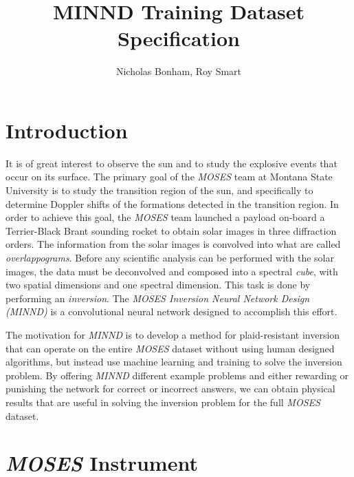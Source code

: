 \documentclass[10pt,a4paper,titlepage]{article}
\author{Nicholas Bonham, Roy Smart}
\title{MINND Training Dataset Specification}
\begin{document}
	\maketitle
	\section{Introduction}
		It is of great interest to observe the sun and to study the explosive events that occur on its  surface. The primary goal of the \textit{MOSES} team at Montana State University is to study the transition region of the sun, and specifically to determine Doppler shifts of the formations detected in the transition region. In order to achieve this goal, the \textit{MOSES} team launched a payload on-board a Terrier-Black Brant sounding rocket to obtain solar images in three diffraction orders. The information from the solar images is convolved into what are called \textit{overlappograms}. Before any scientific analysis can be performed with the solar images, the data must be deconvolved and composed into a spectral \textit{cube}, with two spatial dimensions and one spectral dimension. This task is done by performing an \textit{inversion}. The \textit{MOSES Inversion Neural Network Design (MINND)} is a convolutional neural network designed to accomplish this effort.
		
		The motivation for \textit{MINND} is to develop a method for plaid-resistant inversion that can operate on the entire \textit{MOSES} dataset without using human designed algorithms, but instead use machine learning and training to solve the inversion problem. By offering \textit{MINND} different example problems and either rewarding or punishing the network for correct or incorrect answers, we can obtain physical results that are useful in solving the inversion problem for the full \textit{MOSES} dataset.
		
		
	\section{\textit{MOSES} Instrument}
\end{document}
